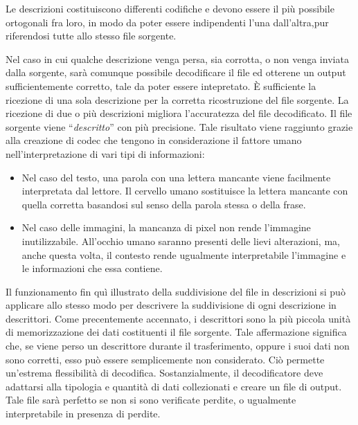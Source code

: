 Le descrizioni costituiscono differenti codifiche e devono essere il più possibile ortogonali fra loro, in modo da poter essere indipendenti l'una dall'altra,pur riferendosi tutte allo stesso file sorgente.

Nel caso in cui qualche descrizione venga persa, sia corrotta, o non venga inviata dalla sorgente, sarà comunque possibile decodificare il file ed otterene un output sufficientemente corretto, tale da poter essere intepretato. \`E sufficiente la ricezione di una sola descrizione per la corretta ricostruzione del file sorgente. La ricezione di due o pi\`u descrizioni migliora l'accuratezza del file decodificato. Il file sorgente viene ``\emph{descritto}'' con pi\`u precisione.  Tale risultato viene raggiunto grazie alla creazione di codec che tengono in considerazione il fattore umano nell'interpretazione di vari tipi di informazioni:
\begin{itemize}
 \item Nel caso del testo, una parola con una lettera mancante viene facilmente interpretata dal lettore. Il cervello umano sostituisce la lettera mancante con quella corretta basandosi sul senso della parola stessa o della frase.
 \item Nel caso delle immagini, la mancanza di pixel non rende l'immagine inutilizzabile. All'occhio umano saranno presenti delle lievi alterazioni, ma, anche questa volta, il contesto rende ugualmente interpretabile l'immagine e le informazioni che essa contiene.
\end{itemize}
Il funzionamento fin qu\`i illustrato della suddivisione del file in descrizioni si pu\`o applicare allo stesso modo per descrivere la suddivisione di ogni descrizione in descrittori. Come precentemente accennato, i descrittori sono la pi\`u piccola unit\`a di memorizzazione dei dati costituenti il file sorgente. Tale affermazione significa che, se viene perso un descrittore durante il trasferimento, oppure i suoi dati non sono corretti, esso può essere semplicemente non considerato. Ci\`o permette un'estrema flessibilit\`a di decodifica. Sostanzialmente, il decodificatore deve adattarsi alla tipologia e quantit\`a di dati collezionati e creare un file di output. Tale file sar\`a perfetto se non si sono verificate perdite, o ugualmente interpretabile in presenza di perdite.

